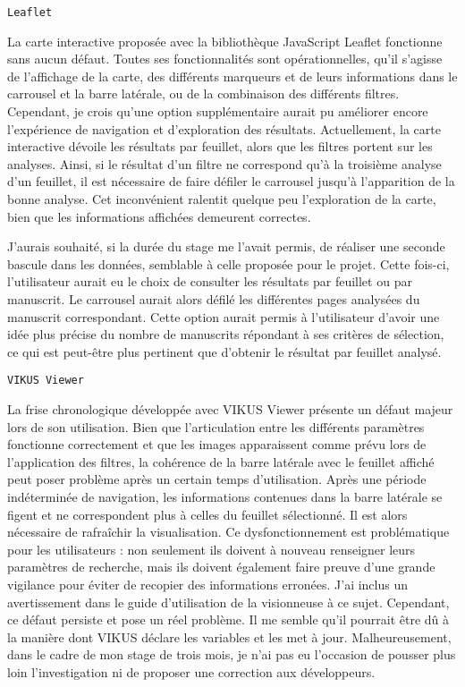 \texttt{Leaflet}\par
La carte interactive proposée avec la bibliothèque JavaScript Leaflet fonctionne sans aucun défaut. Toutes ses fonctionnalités sont opérationnelles, qu'il s'agisse de l'affichage de la carte, des différents marqueurs et de leurs informations dans le carrousel et la barre latérale, ou de la combinaison des différents filtres. Cependant, je crois qu'une option supplémentaire aurait pu améliorer encore l'expérience de navigation et d'exploration des résultats. Actuellement, la carte interactive dévoile les résultats par feuillet, alors que les filtres portent sur les analyses. Ainsi, si le résultat d’un filtre ne correspond qu’à la troisième analyse d’un feuillet, il est nécessaire de faire défiler le carrousel jusqu’à l’apparition de la bonne analyse. Cet inconvénient ralentit quelque peu l’exploration de la carte, bien que les informations affichées demeurent correctes.\par
J'aurais souhaité, si la durée du stage me l’avait permis, de réaliser une seconde bascule dans les données, semblable à celle proposée pour le projet. Cette fois-ci, l’utilisateur aurait eu le choix de consulter les résultats par feuillet ou par manuscrit. Le carrousel aurait alors défilé les différentes pages analysées du manuscrit correspondant. Cette option aurait permis à l’utilisateur d’avoir une idée plus précise du nombre de manuscrits répondant à ses critères de sélection, ce qui est peut-être plus pertinent que d’obtenir le résultat par feuillet analysé.\\\par
\texttt{VIKUS Viewer}\par
La frise chronologique développée avec VIKUS Viewer présente un défaut majeur lors de son utilisation. Bien que l’articulation entre les différents paramètres fonctionne correctement et que les images apparaissent comme prévu lors de l'application des filtres, la cohérence de la barre latérale avec le feuillet affiché peut poser problème après un certain temps d’utilisation. Après une période indéterminée de navigation, les informations contenues dans la barre latérale se figent et ne correspondent plus à celles du feuillet sélectionné. Il est alors nécessaire de rafraîchir la visualisation. Ce dysfonctionnement est problématique pour les utilisateurs : non seulement ils doivent à nouveau renseigner leurs paramètres de recherche, mais ils doivent également faire preuve d'une grande vigilance pour éviter de recopier des informations erronées. J'ai inclus un avertissement dans le guide d’utilisation de la visionneuse à ce sujet. Cependant, ce défaut persiste et pose un réel problème. Il me semble qu'il pourrait être dû à la manière dont VIKUS déclare les variables et les met à jour. Malheureusement, dans le cadre de mon stage de trois mois, je n'ai pas eu l'occasion de pousser plus loin l’investigation ni de proposer une correction aux développeurs.\\\par
